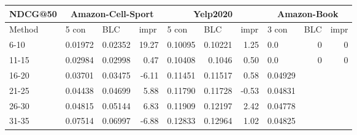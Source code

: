 \begin{table*}[h!] %
    \centering
    \begin{tabular}{|l|r|r|r||l|r|r||l|l|l|}
        \hline
        NDCG@50 & \multicolumn{3}{c||}{Amazon-Cell-Sport} & \multicolumn{3}{c||}{Yelp2020} & \multicolumn{3}{c|}{Amazon-Book}                                                                                                                               \\ \hline
        Method  & \multicolumn{1}{l|}{5 con}              & \multicolumn{1}{l|}{BLC}       & \multicolumn{1}{l||}{impr}       & 5 con   & \multicolumn{1}{l|}{BLC} & \multicolumn{1}{l||}{impr} & 3 con   & BLC                    & impr                   \\ \hline
        6-10    & 0.01972                                 & 0.02352                        & 19.27                            & 0.10095 & 0.10221                  & 1.25                       & 0.0     & \multicolumn{1}{r|}{0} & \multicolumn{1}{r|}{0} \\ \hline
        11-15   & 0.02984                                 & 0.02998                        & 0.47                             & 0.10408 & 0.1046                   & 0.50                       & 0.0     & \multicolumn{1}{r|}{0} & \multicolumn{1}{r|}{0} \\ \hline
        16-20   & 0.03701                                 & 0.03475                        & -6.11                            & 0.11451 & 0.11517                  & 0.58                       & 0.04929 &                        &                        \\ \hline
        21-25   & 0.04438                                 & 0.04699                        & 5.88                             & 0.11790 & 0.11728                  & -0.53                      & 0.04831 &                        &                        \\ \hline
        26-30   & 0.04815                                 & 0.05144                        & 6.83                             & 0.11909 & 0.12197                  & 2.42                       & 0.04778 &                        &                        \\ \hline
        31-35   & 0.07514                                 & 0.06997                        & -6.88                            & 0.12833 & 0.12964                  & 1.02                       & 0.04825 &                        &                        \\ \hline

\end{tabular}
\end{table*}
